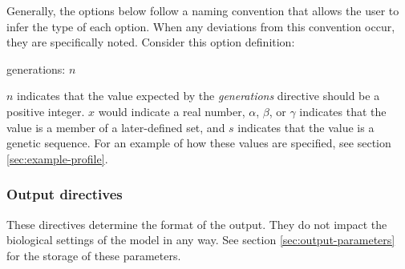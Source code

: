 \documentclass{article}
\begin{document}
        Generally, the options below follow a naming convention that allows the
        user to infer the type of each option. When any deviations from this
        convention occur, they are specifically noted. Consider this option
        definition:

        \begin{center}
          generations: $n$
        \end{center}

        \noindent $n$ indicates that the value expected by the {\em generations}
        directive should be a positive integer. $x$ would indicate a real
        number, $\alpha$, $\beta$, or $\gamma$ indicates that the value is a
        member of a later-defined set, and $s$ indicates that the value is a
        genetic sequence. For an example of how these values are specified, see
        section \ref{sec:example-profile}.

      \subsubsection{Output directives}
        \label{sec:output-directives}

        These directives determine the format of the output. They do not impact
        the biological settings of the model in any way. See section
	\ref{sec:output-parameters} for the storage of these parameters.
\end{document}

